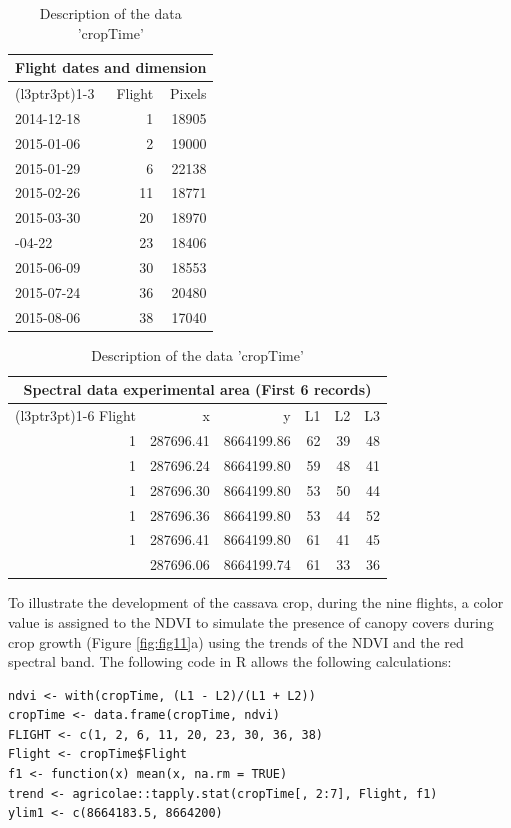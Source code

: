 \begin{table}
\caption{\label{tab:EU8}Description of the data 'cropTime'}

\begin{tabular}{lrr}
\toprule
\multicolumn{3}{c}{Flight dates and dimension} \\
\cmidrule(l{3pt}r{3pt}){1-3}
  & Flight & Pixels\\
\midrule
2014-12-18 & 1 & 18905\\
2015-01-06 & 2 & 19000\\
2015-01-29 & 6 & 22138\\
2015-02-26 & 11 & 18771\\
2015-03-30 & 20 & 18970\\
\addlinespace
2015-04-22 & 23 & 18406\\
2015-06-09 & 30 & 18553\\
2015-07-24 & 36 & 20480\\
2015-08-06 & 38 & 17040\\
\bottomrule
\end{tabular}
\begin{tabular}{rrrrrr}
\toprule
\multicolumn{6}{c}{Spectral data experimental area (First 6 records)} \\
\cmidrule(l{3pt}r{3pt}){1-6}
Flight & x & y & L1 & L2 & L3\\
\midrule
1 & 287696.41 & 8664199.86 & 62 & 39 & 48\\
1 & 287696.24 & 8664199.80 & 59 & 48 & 41\\
1 & 287696.30 & 8664199.80 & 53 & 50 & 44\\
1 & 287696.36 & 8664199.80 & 53 & 44 & 52\\
1 & 287696.41 & 8664199.80 & 61 & 41 & 45\\
\addlinespace
1 & 287696.06 & 8664199.74 & 61 & 33 & 36\\
\bottomrule
\end{tabular}
\end{table}

To illustrate the development of the cassava crop, during the nine flights, a color value is assigned to the NDVI to simulate the presence of canopy covers during crop growth (Figure \ref{fig:fig11}a) using the trends of the NDVI and the red spectral band. The following code in R allows the following calculations:

\begin{verbatim}
ndvi <- with(cropTime, (L1 - L2)/(L1 + L2))
cropTime <- data.frame(cropTime, ndvi)
FLIGHT <- c(1, 2, 6, 11, 20, 23, 30, 36, 38)
Flight <- cropTime$Flight
f1 <- function(x) mean(x, na.rm = TRUE)
trend <- agricolae::tapply.stat(cropTime[, 2:7], Flight, f1)
ylim1 <- c(8664183.5, 8664200)
\end{verbatim}

